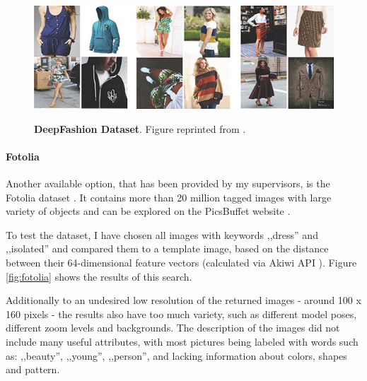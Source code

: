\documentclass[12pt]{report}
\begin{document}
\begin{figure}[h]
\centering
{\includegraphics[width=\linewidth]{03_analysis/data/deepfashion}}
\caption{\label{fig:deepfashion} \textbf{DeepFashion Dataset}. Figure reprinted from \cite{liu2016deepfashion}.}
\end{figure}

\paragraph{Fotolia}
Another available option, that has been provided by my supervisors, is the Fotolia  dataset \cite{noauthor_fotolia_nodate}. It contains more than 20 million tagged images with large variety of objects and can be explored on the PicsBuffet website \cite{mackowiak_picsbuffet_nodate}.

To test the dataset, I have chosen all images with keywords ,,dress'' and ,,isolated'' and compared them to a template image, based on the distance between their 64-dimensional feature vectors (calculated via Akiwi API \cite{sonnenberg_akiwi_nodate}). Figure \ref{fig:fotolia} shows the results of this search. 

Additionally to an undesired low resolution of the returned images - around 100 x 160 pixels - the results also have too much variety, such as different model poses, different zoom levels and backgrounds. The description of the images did not include many useful attributes, with most pictures being labeled with words such as: ,,beauty'', ,,young'', ,,person'', and lacking information about colors, shapes and pattern.
\end{document}
